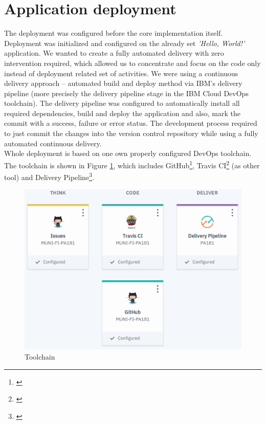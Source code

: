 \documentclass[11pt,a4paper]{article}
\begin{document}
\section{Application deployment}

The deployment was configured before the core implementation itself. Deployment was initialized and configured on the already set \textit{'Hello, World!'} application. We wanted to create a fully automated delivery with zero intervention required, which allowed us to concentrate and focus on the code only instead of deployment related set of activities. We were using a continuous delivery approach -- automated build and deploy method via IBM's delivery pipeline (more precisely the delivery pipeline stage in the IBM Cloud DevOps toolchain). The delivery pipeline was configured to automatically install all required dependencies, build and deploy the application and also, mark the commit with a success, failure or error status. The development process required to just commit the changes into the version control repository while using a fully automated continuous delivery.\\

Whole deployment is based on one own properly configured DevOps toolchain. The toolchain is shown in Figure \ref{fig:toolchain}, which includes GitHub\footnote{\href{https://console.bluemix.net/docs/services/ContinuousDelivery/toolchains\_integrations.html\#github}{\color{urlColor}{console.bluemix.net/docs/services/ContinuousDelivery/toolchains\_integrations.html\#github}}}, Travis CI\footnote{\href{https://console.bluemix.net/docs/services/ContinuousDelivery/toolchains\_integrations.html\#othertool}{\color{urlColor}{console.bluemix.net/docs/services/ContinuousDelivery/toolchains\_integrations.html\#othertool}}} (as other tool) and Delivery Pipeline\footnote{\href{https://console.bluemix.net/docs/services/ContinuousDelivery/toolchains\_integrations.html\#deliverypipeline}{\color{urlColor}{console.bluemix.net/docs/services/ContinuousDelivery/toolchains\_integrations.html\#deliverypipeline}}}.

\begin{figure}[H]
    \centering
    \includegraphics[scale=0.3]{img/toolchain.png}
    \caption{Toolchain}
    \label{fig:toolchain}
\end{figure}
\end{document}
